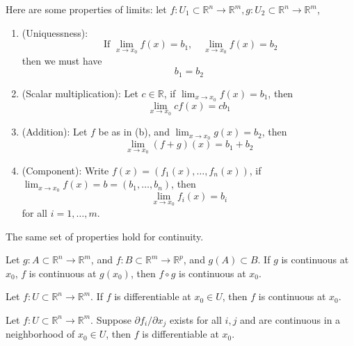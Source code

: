 \documentclass[openany]{book}
\newcommand{\R}{\mathbb{R}}
\begin{document}
\begin{prop}[limits]
    Here are some properties of limits: let $f: U_1\subset\R^n\to\R^m, g: U_2\subset\R^n\to\R^m$,
    \begin{enumerate}
        \item[(a)] (Uniquessness):  \begin{equation*}
            \text{ If } \lim_{x\to x_0}f(x)=b_1, \quad \lim_{x\to x_0}f(x)=b_2
        \end{equation*}
        then we must have 
        \begin{equation*}
            b_1=b_2
        \end{equation*}
        \item[(b)] (Scalar multiplication): Let $c\in\R$, if $\lim_{x\to x_0}f(x)=b_1$, then 
        \begin{equation*}
            \lim_{x\to x_0}cf(x)=cb_1
        \end{equation*}
        \item[(c)] (Addition): Let $f$ be as in (b), and $\lim_{x\to x_0}g(x)=b_2$, then 
        \begin{equation*}
            \lim_{x\to x_0}(f+g)(x)=b_1+b_2
        \end{equation*}
        \item[(d)] (Component): Write $f(x)=(f_1(x),\dots, f_n(x))$, if $\lim_{x\to x_0}f(x)=b=(b_1,\dots, b_n)$, then 
        \begin{equation*}
            \lim_{x\to x_0}f_i(x)=b_i
        \end{equation*}
        for all $i=1,\dots, m$.
    \end{enumerate}
    The same set of properties hold for continuity.
\end{prop}

\begin{prop}
    Let $g: A\subset\R^n\to\R^m$, and $f: B\subset\R^m\to\R^p$, and $g(A)\subset B$. If $g$ is continuous at $x_0$, $f$ is continuous at $g(x_0)$, then $f\circ g$ is continuous at $x_0$.
\end{prop}

\begin{prop}
    Let $f:U\subset\R^n\to\R^m$. If $f$ is differentiable at $x_0\in U$, then $f$ is continuous at $x_0$.
\end{prop}

\begin{prop}[differentiability]
    Let $f:U\subset\R^n\to\R^m$. Suppose $\partial f_i/\partial x_j$ exists for all $i,j$ and are continuous in a neighborhood of $x_0\in U$, then $f$ is differentiable at $x_0$.
\end{prop}
\end{document}
